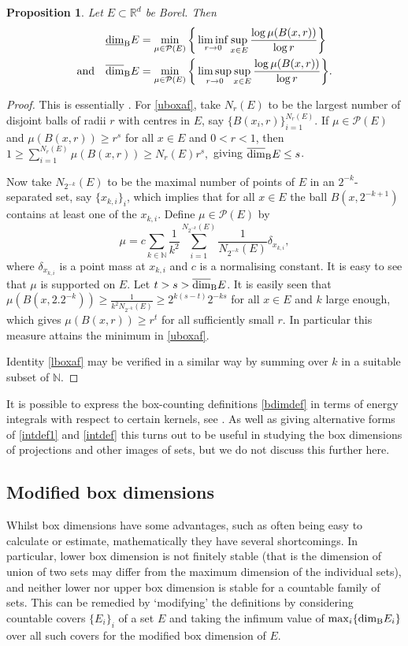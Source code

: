 \documentclass[12pt]{article}
\newcommand{\1}{{\bf 1}}
\newcommand\ubd{\overline{\mbox{\rm dim}}_{\rm B}} %
\newcommand\lbd{\underline{\mbox{\rm dim}}_{\rm B}} %
\newcommand\bdd{\mbox{\rm dim}_{\rm B}}%
\newtheorem{prop}[theo]{Proposition}
\begin{document}
\begin{prop}\label{boxprop2}
Let $E \subset \mathbb{R}^d$ be Borel. Then
\begin{align}
\lbd E &=\min_{\mu\in \mathcal{P}(E)}\bigg\{ \liminf_{r\to 0} \sup_{x\in E}\frac{\log  \mu(B(x,r))}{ \log r} \bigg\} \label{lboxaf}\\
\mbox{and} \quad 
\ubd E &=\min_{\mu\in \mathcal{P}(E)}\bigg\{ \limsup_{r\to 0} \sup_{x\in E}\frac{\log  \mu(B(x,r))}{ \log r} \bigg\}. \label{uboxaf}
\end{align}
\end{prop}
\begin{proof}
This is essentially \cite[Theorem 2.1]{FFK}.  For \eqref{uboxaf}, take  $N_r(E)$ to be the largest number of disjoint balls of radii $r$  with centres in $E$, say $\{B(x_i,r)\}_{i=1}^{N_r(E)}$.  If  $\mu \in  {\mathcal P}(E)$ and $\mu(B(x,r))\geq r^s$ for all $x\in E$ and $0<r<1$,  then
	$1\geq \sum_{i=1}^{N_r(E)}\mu(B(x,r))\geq N_r(E)r^s,$
	giving  $\ubd E \leq s$.
	
	Now take $N_{2^{-k}}(E)$ to be the maximal number of points of $E$ in an $2^{-k}$-separated set, say $\{x_{k,i}\}_i$, which implies that for all $x\in E$ the ball $B(x, 2^{-k+1})$ contains at least one of the $x_{k,i}$. Define $\mu \in  {\mathcal P}(E)$ by
	$$\mu = c\sum_{k\in \mathbb{N}} \frac{1}{k^2} \sum_{i=1}^{N_{2^{-k}}(E)} \frac{1}{N_{2^{-k}}(E)}\delta_{x_{k,i}},$$
	where $\delta_{x_{k,i}}$ is a point mass at $x_{k,i}$ and $c$ is a normalising constant. 
	It is easy to see that $\mu$ is supported on $E$.
	Let $t>s>\ubd E$.
	It is easily seen that $\mu(B(x,2.2^{-k}))\geq\frac{1}{ k^{2}N_{2^{-k}}(E)}\geq 2^{k(s-t)}2^{-ks}$ for all $x\in E$ and $k $ large enough, 
	which gives $\mu(B(x,r))\geq r^t $ 
	for all sufficiently small $r$. In particular this measure attains the minimum in \eqref{uboxaf}.
	
	Identity \eqref{lboxaf} may be verified in a similar way by summing over $k$ in a suitable subset of $\mathbb{N}$.
\end{proof}

It is possible to express the box-counting definitions \eqref{bdimdef} in terms of energy integrals with respect to certain kernels, see \cite{Fa}. As well as giving alternative forms of \eqref{intdef1} and \eqref{intdef} this turns out to be useful in studying the box dimensions of projections and other images of sets, but we do not discuss this further here.

\subsection{Modified box dimensions}
Whilst box dimensions have some advantages, such as often being easy to calculate or estimate, mathematically they have several shortcomings. In particular,  lower box dimension is not finitely stable (that is the dimension of  union of two sets may differ from the maximum dimension of the individual sets), and neither lower nor upper box dimension is  stable for a countable family of sets. This can be remedied by `modifying' the definitions by considering countable covers $\{E_i\}_i$ of a set $E$ and taking the infimum  value of $\max_i \{\bdd E_i\}$ over all such covers for the modified box dimension of $E$.
\end{document}
